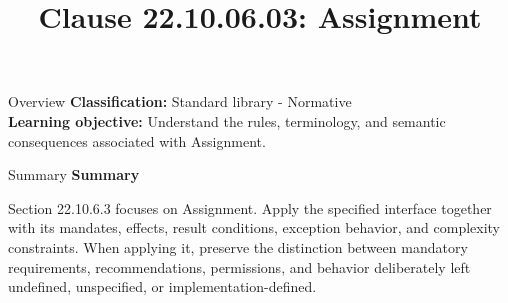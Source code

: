 \documentclass[10pt,letterpaper]{article}
\title{Clause 22.10.06.03: Assignment}
\author{}
\date{}
\begin{document}
\maketitle
\begin{CornellOverviewBox}{Overview}
\textbf{Classification:} Standard library - Normative\\[2pt]
\textbf{Learning objective:} Understand the rules, terminology, and semantic consequences associated with Assignment.
\end{CornellOverviewBox}\begin{CornellSummaryBox}{Summary}
{\sffamily\bfseries\color{Accent} Summary}\par\vspace{3pt}Section 22.10.6.3 focuses on Assignment. Apply the specified interface together with its mandates, effects, result conditions, exception behavior, and complexity constraints. When applying it, preserve the distinction between mandatory requirements, recommendations, permissions, and behavior deliberately left undefined, unspecified, or implementation-defined.
\end{CornellSummaryBox}
\end{document}
